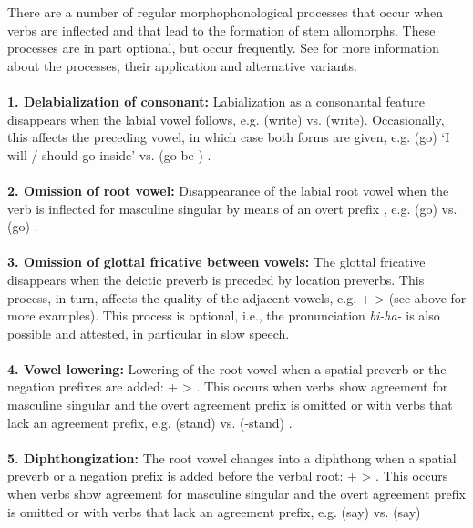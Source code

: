 There are a number of regular morphophonological processes that occur when verbs are inflected and that lead to the formation of stem allomorphs. These processes are in part optional, but occur frequently. See  for more information about the processes, their application and alternative variants.  \\\\
\textbf{1. Delabialization of consonant:} Labialization as a consonantal feature disappears when the labial vowel  follows, e.g.  (write) vs.  (write). Occasionally, this affects the preceding vowel, in which case both forms are given, e.g.  (go) `I will / should go inside' vs.  (go be-) . \\\\
\textbf{2. Omission of root vowel:} Disappearance of the labial root vowel when the verb is inflected for masculine singular by means of an overt prefix , e.g.  (go)  vs.  (go) . \\
\\
\textbf{3. Omission of glottal fricative between vowels:} The glottal fricative disappears when the deictic preverb  is preceded by location preverbs. This process, in turn, affects the quality of the adjacent vowels, e.g.  +  >  (see  above for more examples). This process is optional, i.e., the pronunciation \textit{bi-ha-} is also possible and attested, in particular in slow speech.\\
\\
\textbf{4. Vowel lowering:} Lowering of the root vowel  when a spatial preverb  or the negation prefixes  are added:  +  > . This occurs when verbs show agreement for masculine singular and the overt agreement prefix is omitted or with verbs that lack an agreement prefix, e.g.  (stand)  vs.  (-stand) .\\\\
\textbf{5. Diphthongization:} The root vowel  changes into a diphthong when a spatial preverb  or a negation prefix  is added before the verbal root:  +  > . This occurs when verbs show agreement for masculine singular and the overt agreement prefix is omitted or with verbs that lack an agreement prefix, e.g.  (say)  vs.  (say) \\
